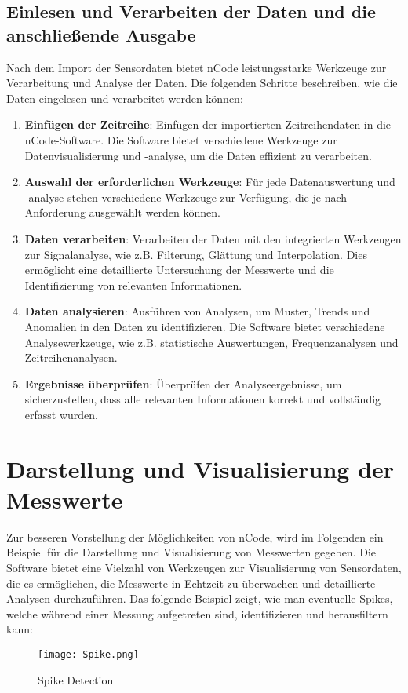 \subsection{Einlesen und Verarbeiten der Daten und die anschließende Ausgabe}
Nach dem Import der Sensordaten bietet nCode leistungsstarke Werkzeuge zur Verarbeitung und Analyse der Daten. Die folgenden Schritte beschreiben, wie die Daten eingelesen und verarbeitet werden können:

\begin{enumerate}
    \item \textbf{Einfügen der Zeitreihe}: Einfügen der importierten Zeitreihendaten in die nCode-Software. Die Software bietet verschiedene Werkzeuge zur Datenvisualisierung und -analyse, um die Daten effizient zu verarbeiten.
    \item \textbf{Auswahl der erforderlichen Werkzeuge}: Für jede Datenauswertung und -analyse stehen verschiedene Werkzeuge zur Verfügung, die je nach Anforderung ausgewählt werden können.
    \item \textbf{Daten verarbeiten}: Verarbeiten der Daten mit den integrierten Werkzeugen zur Signalanalyse, wie z.B. Filterung, Glättung und Interpolation. Dies ermöglicht eine detaillierte Untersuchung der Messwerte und die Identifizierung von relevanten Informationen.
    \item \textbf{Daten analysieren}: Ausführen von Analysen, um Muster, Trends und Anomalien in den Daten zu identifizieren. Die Software bietet verschiedene Analysewerkzeuge, wie z.B. statistische Auswertungen, Frequenzanalysen und Zeitreihenanalysen.
    \item \textbf{Ergebnisse überprüfen}: Überprüfen der Analyseergebnisse, um sicherzustellen, dass alle relevanten Informationen korrekt und vollständig erfasst wurden.   
\end{enumerate}

\section{Darstellung und Visualisierung der Messwerte}
Zur besseren Vorstellung der Möglichkeiten von nCode, wird im Folgenden ein Beispiel für die Darstellung und Visualisierung von Messwerten gegeben. Die Software bietet eine Vielzahl von Werkzeugen zur Visualisierung von Sensordaten, die es ermöglichen, die Messwerte in Echtzeit zu überwachen und detaillierte Analysen durchzuführen. Das folgende Beispiel zeigt, wie man eventuelle Spikes, welche während einer Messung aufgetreten sind, identifizieren und herausfiltern kann:

\begin{figure}[h]
    \begin{center}
        \texttt{[image: Spike.png]}
        \caption[Spike Detection in nCode]{Spike Detection
        }
        \label{fig:Spike}
    \end{center}
\end{figure}